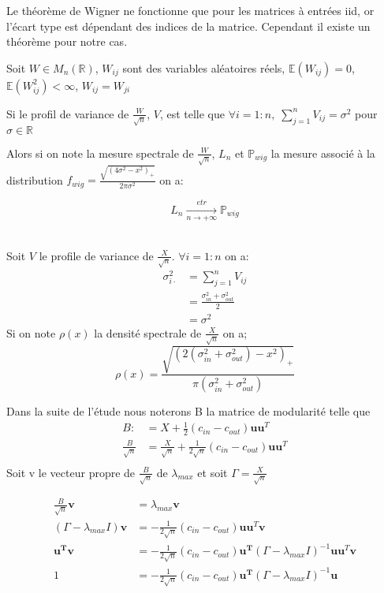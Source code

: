 Le théorème de Wigner ne fonctionne que pour les matrices à entrées iid, or l'écart type est dépendant des indices de la matrice.
Cependant il existe un théorème pour notre cas.
\begin{theorem}
Soit $W \in M_{n}(\mathbb{R})$, $W_{ij}$ sont des variables aléatoires réels, $\mathbb{E}(W_{ij}) = 0$, $\mathbb{E}(W_{ij}^2) < \infty$, $W_{ij} = W_{ji}$

Si le profil de variance de $\frac{W}{\sqrt{n}}$, $V$, est telle que $\forall i = 1:n , \; \sum_{j=1}^{n}V_{ij} = \sigma^2$ pour $\sigma \in \mathbb{R}$

Alors si on note la mesure spectrale de $\frac{W}{\sqrt{n}}$, $L_{n}$  et $\mathbb{P}_{wig}$ la mesure associé à la distribution $f_{wig}= \frac{\sqrt{(4\sigma^2 - x^2)_+}}{2\pi\sigma^2}$ on a:

\begin{equation}
	L_n\xrightarrow[n \to +\infty]{etr} \mathbb{P}_{wig}\nonumber
\end{equation}\\
\end{theorem}

Soit $V$ le profile de variance de $\frac{X}{\sqrt{n}}$. $\forall i = 1:n$ on a: 
\begin{align*} 
\sigma_{i \cdot}^2 &= \sum_{j=1}^{n}V_{ij}  \\
 		&= \frac{\sigma_{in}^2 + \sigma_{out}^2}{2}  \\
		&=\sigma^2
\end{align*}
Si on note $\rho(x)$ la densité spectrale de $\frac{X}{\sqrt{n}}$ on a;
\begin{equation}
	\rho(x) = \frac{\sqrt{(2(\sigma_{in}^2 + \sigma_{out}^2) - x^2)_+}}{\pi(\sigma_{in}^2 + \sigma_{out}^2)}
\end{equation}

Dans la suite de l'étude nous noterons B la matrice de modularité telle que 
\begin{align*} 
B :&= X + \frac{1}{2}(c_{in} - c_{out})\mathbf{uu}^T \\
\frac{B}{\sqrt{n}} &= \frac{X}{\sqrt{n}} + \frac{1}{2\sqrt{n}}(c_{in} - c_{out})\mathbf{uu}^T\\
\end{align*}
Soit v le vecteur propre de $\frac{B}{\sqrt{n}}$ de $\lambda_{max}$ et soit $\Gamma = \frac{X}{\sqrt{n}}$

\begin{align} 
\frac{B}{\sqrt{n}}\mathbf{v} &= \lambda_{max}\mathbf{v} \nonumber\\
(\Gamma - \lambda_{max}I)\mathbf{v} &= -\frac{1}{2\sqrt{n}}(c_{in} - c_{out})\mathbf{uu}^T \mathbf{v} \nonumber\\
 \mathbf{u^Tv} &= -\frac{1}{2\sqrt{n}}(c_{in} - c_{out})\mathbf{u^T}(\Gamma - \lambda_{max}I)^{-1}\mathbf{uu}^T \mathbf{v} \nonumber\\
 1 &= -\frac{1}{2\sqrt{n}}(c_{in} - c_{out})\mathbf{u^T}(\Gamma - \lambda_{max}I)^{-1}\mathbf{u} \label{eq:3}
\end{align}

